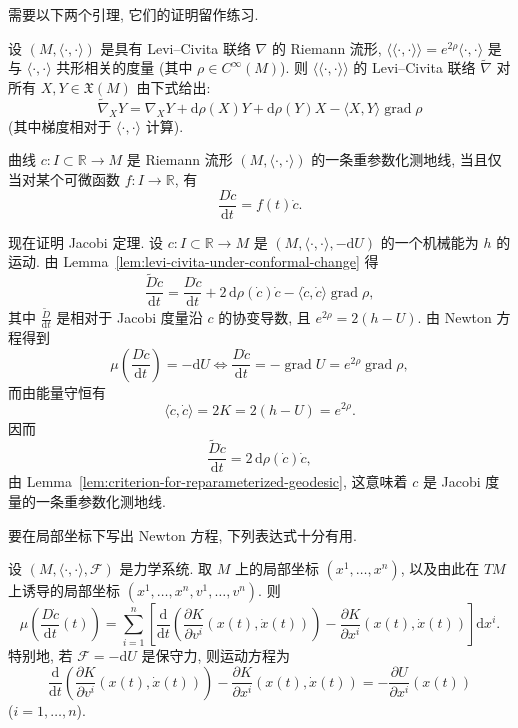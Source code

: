 \begin{RiemannProof}
需要以下两个引理, 它们的证明留作练习.

\begin{RiemannLemma}\label{lem:levi-civita-under-conformal-change}
设 $(M,\langle\cdot,\cdot\rangle)$ 是具有 Levi–Civita 联络 $\nabla$ 的 Riemann 流形, $\langle\!\langle\cdot,\cdot\rangle\!\rangle=e^{2\rho}\langle\cdot,\cdot\rangle$ 是与 $\langle\cdot,\cdot\rangle$ 共形相关的度量 (其中 $\rho\in C^\infty(M)$). 则 $\langle\!\langle\cdot,\cdot\rangle\!\rangle$ 的 Levi–Civita 联络 $\widetilde\nabla$ 对所有 $X,Y\in\mathfrak{X}(M)$ 由下式给出:
\[
  \widetilde\nabla_XY=\nabla_XY+\mathrm{d}\rho(X)Y+\mathrm{d}\rho(Y)X
    -\langle X,Y\rangle\operatorname{grad}\rho
\]
(其中梯度相对于 $\langle\cdot,\cdot\rangle$ 计算).\hfill\openbox
\end{RiemannLemma}

\begin{RiemannLemma}\label{lem:criterion-for-reparameterized-geodesic}
曲线 $c:I\subset\mathbb{R}\to M$ 是 Riemann 流形 $(M,\langle\cdot,\cdot\rangle)$ 的一条重参数化测地线, 当且仅当对某个可微函数 $f:I\to\mathbb{R}$, 有
\[
  \frac{D\dot c}{\mathrm{d}t}=f(t)\dot c.
\]
\mbox{}\hfill\openbox
\end{RiemannLemma}

现在证明 Jacobi 定理. 设 $c:I\subset\mathbb{R}\to M$ 是 $(M,\langle\cdot,\cdot\rangle,-\mathrm{d}U)$ 的一个机械能为 $h$ 的运动. 由 Lemma~\ref{lem:levi-civita-under-conformal-change} 得
\[
  \frac{\widetilde D\dot c}{\mathrm{d}t}
  =\frac{D\dot c}{\mathrm{d}t}+2\,\mathrm{d}\rho(\dot c)\dot c
    -\langle\dot c,\dot c\rangle\operatorname{grad}\rho,
\]
其中 $\frac{\widetilde D}{\mathrm{d}t}$ 是相对于 Jacobi 度量沿 $c$ 的协变导数, 且 $e^{2\rho}=2(h-U)$. 由 Newton 方程得到
\[
  \mu\left(\frac{D\dot c}{\mathrm{d}t}\right)=-\mathrm{d}U
  \Leftrightarrow\frac{D\dot c}{\mathrm{d}t}=-\operatorname{grad}U=e^{2\rho}\operatorname{grad}\rho,
\]
而由能量守恒有
\[
  \langle\dot c,\dot c\rangle=2K=2(h-U)=e^{2\rho}.
\]
因而
\[
  \frac{\widetilde D\dot c}{\mathrm{d}t}=2\,\mathrm{d}\rho(\dot c)\dot c,
\]
由 Lemma~\ref{lem:criterion-for-reparameterized-geodesic}, 这意味着 $c$ 是 Jacobi 度量的一条重参数化测地线.
\end{RiemannProof}

要在局部坐标下写出 Newton 方程, 下列表达式十分有用.

\begin{RiemannProposition}\label{prop:newton-equation-using-kinetic-energy-in-coordinates}
设 $(M,\langle\cdot,\cdot\rangle,\mathcal{F})$ 是力学系统. 取 $M$ 上的局部坐标 $(x^1,\ldots,x^n)$, 以及由此在 $TM$ 上诱导的局部坐标 $(x^1,\ldots,x^n,\allowbreak v^1,\ldots,v^n)$. 则
\[
  \mu\left(\frac{D\dot c}{\mathrm{d}t}(t)\right)=
  \sum_{i=1}^n\left[\frac{\mathrm{d}}{\mathrm{d}t}
  \left(\frac{\partial K}{\partial v^i}(x(t),\dot x(t))\right)
  -\frac{\partial K}{\partial x^i}(x(t),\dot x(t))\right]\mathrm{d}x^i.
\]
特别地, 若 $\mathcal{F}=-\mathrm{d}U$ 是保守力, 则运动方程为
\[
  \frac{\mathrm{d}}{\mathrm{d}t}\left(\frac{\partial K}{\partial v^i}(x(t),\dot x(t))\right)
  -\frac{\partial K}{\partial x^i}(x(t),\dot x(t))=-\frac{\partial U}{\partial x^i}(x(t))
\]
($i=1,\ldots,n$).
\end{RiemannProposition}

